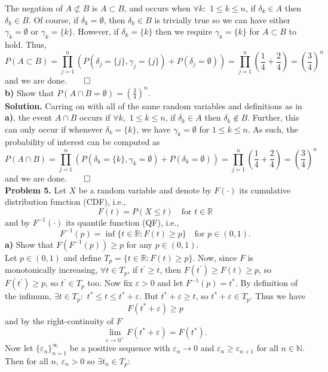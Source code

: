 \documentclass[11pt, letterpaper]{article}
\newcommand{\mbb}[1]{\mathbb{#1}}
\begin{document}
    The negation of $A\not\subset B$ is $A\subset B$, and occurs when $\forall k:$ $1\leq k\leq n$, if $\delta_k\in A$ then $\delta_k\in B$. Of course, if $\delta_k=\emptyset$, then $\delta_k\in B$ is trivially true so we can have either $\gamma_k=\emptyset$ or $\gamma_k=\{k\}$. However, if $\delta_k=\{k\}$ then 
    we require $\gamma_k=\{k\}$ for $A\subset B$ to hold. Thus,
    \[P(A\subset B)=\prod_{j=1}^n\left(P(\delta_j=\{j\},\gamma_j=\{j\})+P(\delta_j=\emptyset)\right)=\prod_{j=1}^n\left(\frac{1}{4}+\frac{2}{4}\right)=\left(\frac{3}{4}\right)^n\]
    and we are done.\hfill{$\qed$}\\[10pt]
    {\bf b)} Show that $P(A\cap B=\emptyset)=\left(\frac{3}{4}\right)^n$.\\[10pt]
    {\bf Solution.} Carring on with all of the same random variables and definitions as in {\bf a)}, the event $A\cap B$ occurs if $\forall k,$ $1\leq k\leq n$, if $\delta_k\in A$ then $\delta_k\notin B$. Further, this can only occur if whenever $\delta_k=\{k\}$, we have $\gamma_k=\emptyset$ for $1\leq k\leq n$.
    As such, the probability of interest can be computed as
    \[P(A\cap B)=\prod_{j=1}^n(P(\delta_k=\{k\}, \gamma_k=\emptyset)+P(\delta_k=\emptyset))=\prod_{j=1}^n\left(\frac{1}{4}+\frac{2}{4}\right)=\left(\frac{3}{4}\right)^n\]
    and we are done.\hfill{$\qed$}\\[10pt]
    {\bf Problem 5.} Let $X$ be a random variable and denote by $F(\cdot)$ its cumulative distribution function (CDF), i.e.,
    \[F(t)=P(X\leq t)\quad \text{for $t\in\mbb{R}$}\]
    and by $F^{-1}(\cdot)$ its quantile function (QF), i.e.,
    \[F^{-1}(p)=\inf\{t\in\mbb{R}:F(t)\geq p\}\quad \text{for $p\in(0,1)$}.\]
    {\bf a)} Show that $F(F^{-1}(p))\geq p$ for any $p\in(0,1)$.\\[10pt]
    Let $p\in(0,1)$ and define $T_p=\{t\in\mbb{R}:F(t)\geq p\}$. Now, since $F$ is monotonically increasing, $\forall t\in T_p$, if $t^\prime\geq t$, then $F(t^\prime)\geq F(t)\geq p$, so $F(t^\prime)\geq p$, so $t^\prime\in T_p$ too.
    Now fix $\varepsilon>0$ and let $F^{-1}(p)=t^\ast$. By definition of the infimum, $\exists t\in T_p:$ $t^\ast\leq t\leq t^\ast+\varepsilon$. But $t^\ast+\varepsilon\geq t$, so $t^\ast+\varepsilon\in T_p$. Thus we have 
    \[F(t^\ast+\varepsilon)\geq p\]
    and by the right-continuity of $F$
    \[\lim_{\varepsilon\longrightarrow 0^+}F(t^\ast+\varepsilon)=F(t^\ast).\]
    Now let $\{\varepsilon_n\}_{n=1}^\infty$ be a positive sequence with $\varepsilon_n\longrightarrow 0$ and $\varepsilon_n\geq\varepsilon_{n+1}$ for all $n\in\mbb{N}$. Then for all $n$, $\varepsilon_n>0$ so $\exists t_n\in T_p:$
\end{document}
